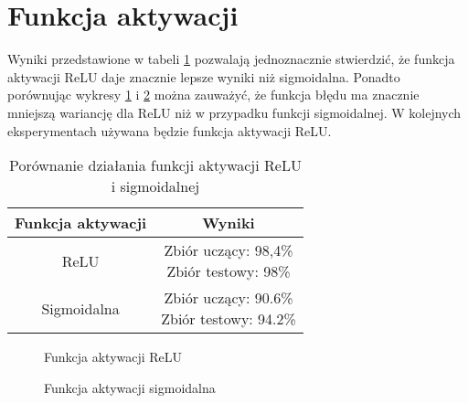 \section{Funkcja aktywacji}
Wyniki przedstawione w tabeli \ref{table:relu_sig} pozwalają jednoznacznie stwierdzić, że funkcja aktywacji ReLU daje znacznie lepsze wyniki niż sigmoidalna. Ponadto porównując wykresy \ref{fig:relu_test} i \ref{fig:sig_test} można zauważyć, że funkcja błędu ma znacznie mniejszą wariancję dla ReLU niż w przypadku funkcji sigmoidalnej. W kolejnych eksperymentach używana będzie funkcja aktywacji ReLU.
\begin{table}[h]
\centering
\begin{tabular}{|c|c|}
\hline
Funkcja aktywacji & Wyniki \\ \hline
ReLU & \makecell{Zbiór uczący: 98,4\% \\ Zbiór testowy: 98\%} \\ \hline
Sigmoidalna & \makecell{Zbiór uczący: 90.6\% \\ Zbiór testowy: 94.2\%} \\ \hline
\end{tabular}
\caption{Porównanie działania funkcji aktywacji ReLU i sigmoidalnej}
\label{table:relu_sig}
\end{table}

\begin{figure}
\centering
{}
\caption{Funkcja aktywacji ReLU}
\label{fig:relu_test}
\end{figure}

\begin{figure}
\centering
{}
\caption{Funkcja aktywacji sigmoidalna}
\label{fig:sig_test}
\end{figure}
